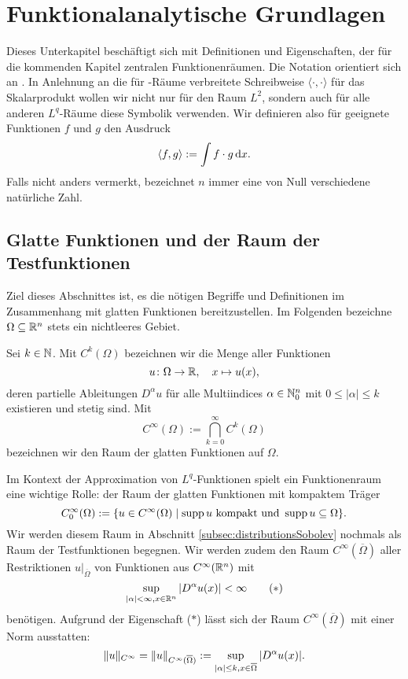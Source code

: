 \chapter{Funktionalanalytische Grundlagen}
\label{cp:grundlagen}

Dieses Unterkapitel beschäftigt sich mit Definitionen und Eigenschaften, der für die kommenden Kapitel zentralen Funktionenräumen.
Die Notation orientiert sich an \cite{sohr2001navier}.
In Anlehnung an die für \hilbert\hyp{}Räume verbreitete Schreibweise $\langle \cdot, \cdot \rangle$ für das Skalarprodukt wollen wir nicht nur für den Raum $L^2$, sondern auch für alle anderen $L^q$\hyp{}Räume diese Symbolik verwenden.
Wir definieren also für geeignete Funktionen $f$ und $g$ den Ausdruck
$$
\langle f, g \rangle := \int f \cdot g \, {\operatorname{d}\!{x}}.
$$
Falls nicht anders vermerkt, bezeichnet $n$ immer eine von Null verschiedene natürliche Zahl.


\section{Glatte Funktionen und der Raum der Testfunktionen}
\label{subsec:smooth}

Ziel dieses Abschnittes ist, es die nötigen Begriffe und Definitionen im Zusammenhang mit glatten Funktionen bereitzustellen.
Im Folgenden bezeichne $\Omega \subseteq \mathbb{R}^n$ stets ein nichtleeres Gebiet.

Sei $k \in \mathbb{N}$. Mit $C^k(\Omega)$ bezeichnen wir die Menge aller Funktionen
$$
u \colon \Omega \to \mathbb{R}, \quad x \mapsto u(x),
$$
deren partielle Ableitungen $D^\alpha u$ für alle Multiindices $\alpha \in \mathbb{N}_0^n$ mit $0 \leq |\alpha| \leq k$ existieren und stetig sind. 
Mit
$$
  C^\infty(\Omega) := \bigcap_{k = 0}^\infty C^k(\Omega)
$$
bezeichnen wir den Raum der glatten Funktionen auf $\Omega$.

Im Kontext der Approximation von $L^q$-Funktionen spielt ein Funktionenraum eine wichtige Rolle: der Raum der glatten Funktionen mit kompaktem Träger
$$
C_0^\infty(\Omega) := \{ u \in C^\infty(\Omega) \mid \operatorname{supp} u \text{ kompakt und } \operatorname{supp} u \subseteq \Omega\}.
$$
Wir werden diesem Raum in Abschnitt \ref{subsec:distributionsSobolev} nochmals als Raum der Testfunktionen begegnen.
Wir werden zudem den Raum $C^\infty(\overline\Omega)$ aller Restriktionen $u|_{\overline\Omega}$ von Funktionen aus $C^\infty(\mathbb{R}^n)$ mit
\begin{displaymath}
  \sup_{|\alpha| < \infty, x \in \mathbb{R}^n} |D^\alpha u(x)| < \infty \tag{$\ast$}
\end{displaymath}
benötigen.
Aufgrund der Eigenschaft ($\ast$) lässt sich der Raum $C^\infty(\overline\Omega)$ mit einer Norm ausstatten:
\begin{equation}
  \label{eq:cInftyNorm}
  \lVert u \rVert_{C^\infty} = \lVert u \rVert_{C^\infty(\overline\Omega)} := \sup_{|\alpha|\leq k, x \in \overline\Omega} |D^\alpha u(x)|.
\end{equation}

